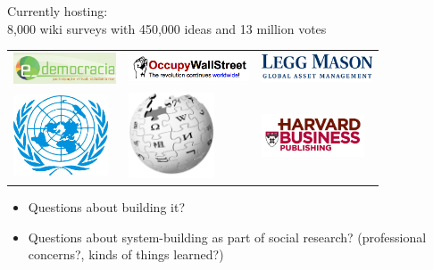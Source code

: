 \documentclass[aspectratio=169]{beamer}
\def\vf{\vfill}
\begin{document}
\begin{frame}

Currently hosting:\\
8,000 wiki surveys with 450,000 ideas and 13 million votes
\vf

\begin{center}
\begin{tabular}{m{1.4in} m{1.4in} m{1.4in}}
\includegraphics[width=1.2in]{figures/edemocracia} & \includegraphics[width=1.4in]{figures/ows_horizontal} & \includegraphics[width=1.3in]{figures/legg_mason_logo}\\
\vspace{0.2in}
\includegraphics[width=1.1in]{figures/un_logo_white_bkg} & \includegraphics[width=1in]{figures/200px-Wikipedia-logo} & \includegraphics[width=1.2in]{figures/harvard_business_publishing}
\end{tabular}
\end{center}

\end{frame}
\begin{frame}

\begin{itemize}
\item Questions about building it?
\item Questions about system-building as part of social research? (professional concerns?, kinds of things learned?)
\end{itemize}

\end{frame}
\end{document}

